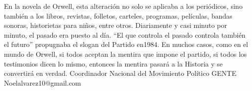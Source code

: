 \documentclass{article}%
\begin{document}
\newline%
%
En la novela de Orwell, esta alteración no solo se aplicaba a los periódicos, sino también a los libros, revistas, folletos, carteles, programas, películas, bandas sonoras, historietas para niños, entre otros. Diariamente y casi minuto por minuto, el pasado era puesto al día. “El que controla el pasado controla también el futuro” propugnaba el slogan del Partido en1984.  En muchos casos, como en el mundo de Orwell, si todos aceptan la mentira que impone el partido, si todos los testimonios dicen lo mismo, entonces la mentira pasará a la Historia y se convertirá en verdad.%
\newline%
%
Coordinador Nacional del Movimiento Político GENTE%
\newline%
%
Noelalvarez10@gmail.com%
\newline%
%
\end{document}
